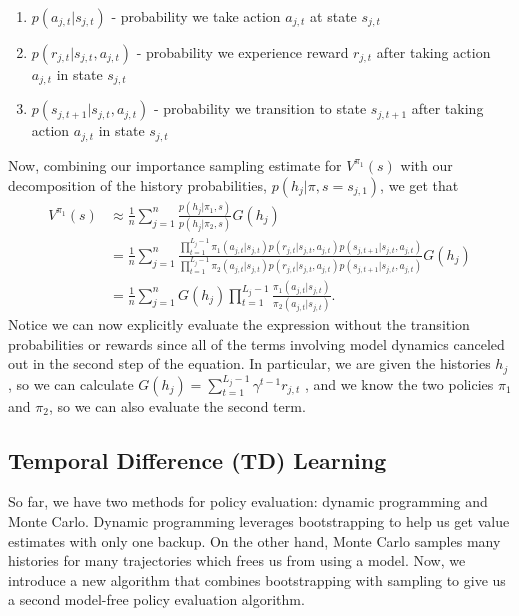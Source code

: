 \documentclass{article}
\begin{document}
\begin{enumerate}[noitemsep,partopsep=0pt,topsep=0pt,parsep=0pt]
\item $p(a_{j,t} | s_{j,t})$ - probability we take action $a_{j,t}$ at state $s_{j,t}$
\item $p(r_{j,t} | s_{j,t}, a_{j,t})$ - probability we experience reward $r_{j,t}$ after taking action $a_{j,t}$ in state $s_{j,t}$
\item $p(s_{j, t+1} | s_{j,t}, a_{j,t})$ - probability we transition to state $s_{j, t+1}$ after taking action $a_{j,t}$ in state $s_{j,t}$
\end{enumerate}

Now, combining our importance sampling estimate for $V^{\pi_1}(s)$ with our decomposition of the history probabilities, $p(h_j | \pi, s=s_{j,1})$, we get that
\begin{align}
V^{\pi_1}(s) &\approx \frac{1}{n} \sum_{j = 1}^n \frac{p(h_j | \pi_1, s)}{p(h_j | \pi_2, s)} G(h_j) \\
&= \frac{1}{n} \sum_{j = 1}^n \frac{\prod_{t = 1}^{L_j - 1} \pi_1(a_{j,t} | s_{j,t}) p(r_{j,t} | s_{j,t}, a_{j,t}) p(s_{j, t+1} | s_{j,t}, a_{j,t})}
{\prod_{t = 1}^{L_j - 1} \pi_2(a_{j,t} | s_{j,t}) p(r_{j,t} | s_{j,t}, a_{j,t}) p(s_{j, t+1} | s_{j,t}, a_{j,t})} G(h_j) \\
&= \frac{1}{n} \sum_{j = 1}^n G(h_j) \prod_{t = 1}^{L_j - 1} \frac{ \pi_1(a_{j,t} | s_{j,t})}
{\pi_2(a_{j,t} | s_{j,t})}.
\end{align}
Notice we can now explicitly evaluate the expression without the transition probabilities or rewards since all of the terms involving model dynamics canceled out in the second step of the equation.  In particular, we are given the histories $h_j$, so we can calculate $G(h_j) = \sum_{t =1}^{L_j - 1} \gamma^{t-1} r_{j, t}$ , and we know the two policies $\pi_1$ and $\pi_2$, so we can also evaluate the second term.

\subsection{Temporal Difference (TD) Learning}

So far, we have two methods for policy evaluation: dynamic programming and Monte Carlo.  Dynamic programming leverages bootstrapping to help us get value estimates with only one backup.  On the other hand, Monte Carlo samples many histories for many trajectories which frees us from using a model.  Now, we introduce a new algorithm that combines bootstrapping with sampling to give us a second model-free policy evaluation algorithm.
\end{document}
